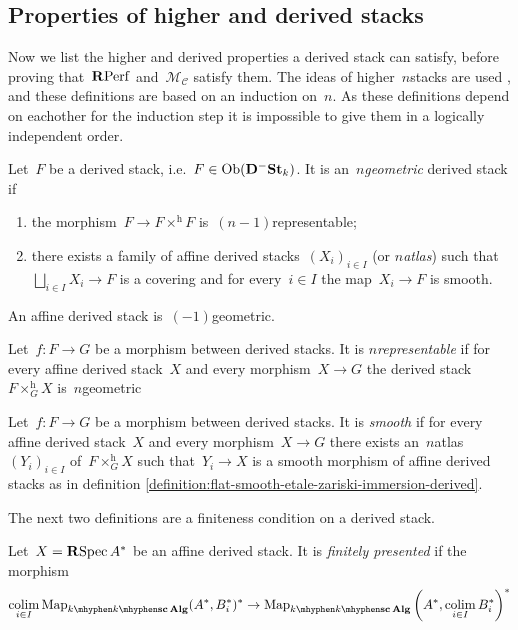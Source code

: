 \begin{refsection}
\subsection{Properties of higher and derived stacks}
Now we list the higher and derived properties a derived stack can satisfy, before proving that~$\mathbf{R}\mathrm{Perf}$ and~$\mathcal{M}_{\mathcal{C}}$ satisfy them. The ideas of higher~$n$\dash stacks are used \cite{simpson}, and these definitions are based on an induction on~$n$. As these definitions depend on eachother for the induction step it is impossible to give them in a logically independent order.
\begin{definition}
  Let~$F$ be a derived stack, i.e.\ $F\in\operatorname{Ob}(\mathbf{D}^-\mathbf{St}_k)$. It is an~\emph{$n$\dash geometric} derived stack if
  \begin{enumerate}
    \item the morphism~$F\to F\times^{\mathrm{h}}F$ is~$(n-1)$\dash representable;
    \item there exists a family of affine derived stacks~$(X_i)_{i\in I}$ (or \emph{$n$\dash atlas}) such that~$\bigsqcup_{i\in I}X_i\to F$ is a covering and for every~$i\in I$ the map~$X_i\to F$ is smooth.
  \end{enumerate}
  An affine derived stack is~$(-1)$\dash geometric.
\end{definition}
\begin{definition}
  Let~$f\colon F\to G$ be a morphism between derived stacks. It is \emph{$n$\dash representable} if for every affine derived stack~$X$ and every morphism~$X\to G$ the derived stack~$F\times_G^{\mathrm{h}}X$ is~$n$\dash geometric
\end{definition}
\begin{definition}
  Let~$f\colon F\to G$ be a morphism between derived stacks. It is \emph{smooth} if for every affine derived stack~$X$ and every morphism~$X\to G$ there exists an~$n$\dash atlas~$(Y_i)_{i\in I}$ of~$F\times_G^{\mathrm{h}}X$ such that~$Y_i\to X$ is a smooth morphism of affine derived stacks as in definition \ref{definition:flat-smooth-etale-zariski-immersion-derived}.
\end{definition}
The next two definitions are a finiteness condition on a derived stack.
\begin{definition}
  Let~$X=\operatorname{\mathbf{R}Spec} A^*$ be an affine derived stack. It is \emph{finitely presented} if the morphism
  \begin{equation}
    \colim_{i\in I}\Map_{k\mhyphen\scAlg}(A^*,B_i^*)^*\to\Map_{k\mhyphen\scAlg}\left( A^*,\colim_{i\in I}B_i^* \right)^*

\end{equation}
\end{definition}
\end{refsection}
